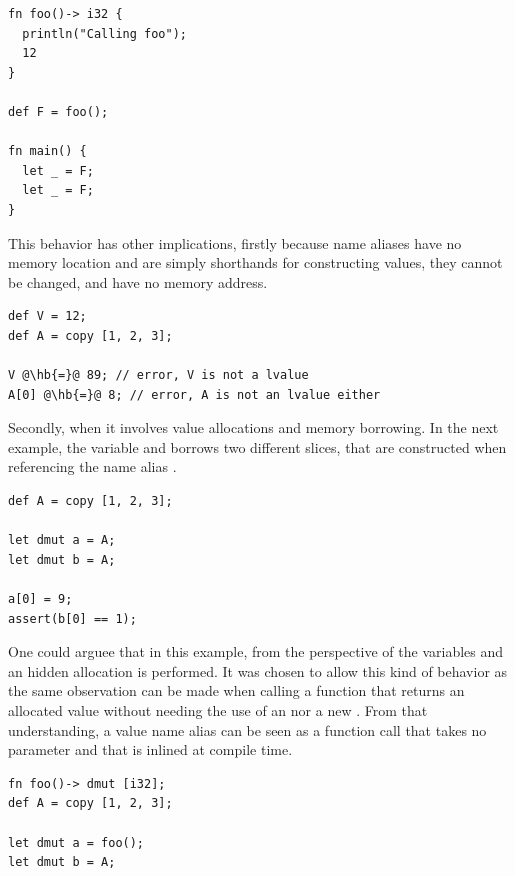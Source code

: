 \begin{lstlisting}[style=coloredverbatim]
fn foo()-> i32 {
  println("Calling foo");
  12
}

def F = foo();

fn main() {
  let _ = F;
  let _ = F;
}
\end{lstlisting}


This behavior has other implications, firstly because name aliases have no
memory location and are simply shorthands for constructing values, they cannot
be changed, and have no memory address.

\begin{lstlisting}[style=coloredverbatimError, escapechar=@]
def V = 12;
def A = copy [1, 2, 3];

V @\hb{=}@ 89; // error, V is not a lvalue
A[0] @\hb{=}@ 8; // error, A is not an lvalue either
\end{lstlisting}

Secondly, when it involves value allocations and memory borrowing. In the next
example, the variable  and  borrows two different slices, that
are constructed when referencing the name alias .

\begin{lstlisting}[style=coloredverbatim]
def A = copy [1, 2, 3];

let dmut a = A;
let dmut b = A;

a[0] = 9;
assert(b[0] == 1);
\end{lstlisting}

One could arguee that in this example, from the perspective of the variables
 and  an hidden allocation is performed. It was chosen to
allow this kind of behavior as the same observation can be made when calling a
function that returns an allocated value without needing the use of an
 nor a new . From that understanding, a value name
alias can be seen as a function call that takes no parameter and that is inlined
at compile time.

\begin{lstlisting}[style=coloredverbatim]
fn foo()-> dmut [i32];
def A = copy [1, 2, 3];

let dmut a = foo();
let dmut b = A;
\end{lstlisting}

\vfill%
\pagebreak
